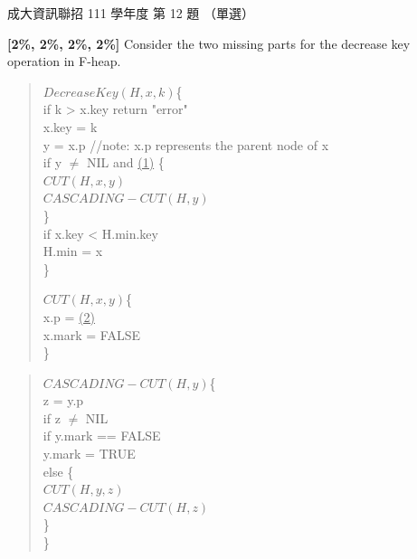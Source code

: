 \begin{pastexam}[label={px:ncku-111-prog-12}]{成大資訊聯招 111 學年度 第 12 題}
（單選）

\textbf{[2\%, 2\%, 2\%, 2\%]} Consider the two missing parts for the decrease key operation in F-heap.

\begin{quote}
$DecreaseKey(H,x,k)$\{\\
\hspace*{0.5em}if k > x.key return "error"\\
\hspace*{0.5em}x.key = k\\
\hspace*{0.5em}y = x.p \quad //note: x.p represents the parent node of x\\
\hspace*{0.5em}if y $\neq$ NIL and \underline{(1)} \{\\
\hspace*{2em}$CUT(H,x,y)$\\
\hspace*{1.5em}$CASCADING-CUT(H,y)$\\
\hspace*{0.5em}\}\\
\hspace*{0.5em}if x.key < H.min.key\\
\hspace*{2em}H.min = x\\
\}

$CUT(H,x,y)$\{\\
\hspace*{0.5em}x.p = \underline{(2)}\\
\hspace*{0.5em}x.mark = FALSE\\
\}
\end{quote}

\begin{quote}
$CASCADING-CUT(H,y)$\{\\
\hspace*{0.5em}z = y.p\\
\hspace*{0.5em}if z $\neq$ NIL\\
\hspace*{2em}if y.mark == FALSE\\
\hspace*{3.5em}y.mark = TRUE\\
\hspace*{2em}else \{\\
\hspace*{3.5em}$CUT(H,y,z)$\\
\hspace*{3.5em}$CASCADING-CUT(H,z)$\\
\hspace*{1em}\}\\
\}
\end{quote}


\end{pastexam}
